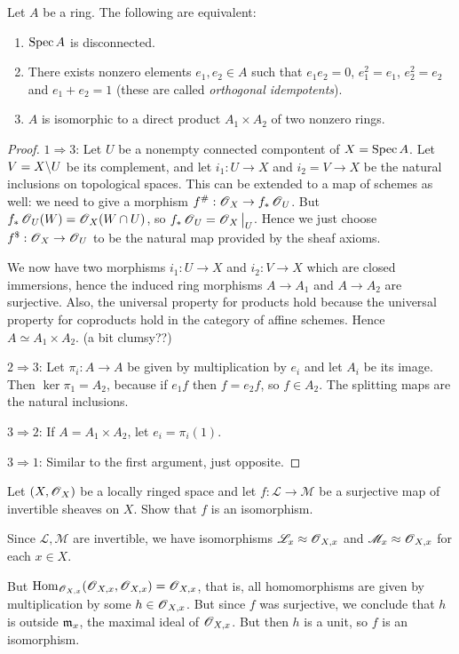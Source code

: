 \documentclass[11pt, english]{article}
\begin{document}
\begin{exc}[Exercise 2.19]
Let $A$ be a ring. The following are equivalent:
\begin{enumerate}
\item $\operatorname{Spec} A$ is disconnected.
\item There exists nonzero elements $e_1,e_2 \in A$ such that $e_1e_2=0$, $e_1^2=e_1$, $e_2^2=e_2$ and $e_1+e_2=1$ (these are called \emph{orthogonal idempotents}).
\item $A$ is isomorphic to a direct product $A_1 \times A_2$ of two nonzero rings.
\end{enumerate}
\end{exc}
\begin{proof}
$1 \Rightarrow 3$: Let $U$ be a nonempty connected compontent of $X=\operatorname{Spec} A$. Let $V = X \backslash U$ be its complement, and let $i_1:U \to X$ and $i_2=V \to X$ be the natural inclusions on topological spaces. This can be extended to a map of schemes as well: we need to give a morphism $f^\#:\operatorname{\mathscr{O}}_X \to f_\ast \operatorname{\mathscr{O}}_U$. But $f_\ast \operatorname{\mathscr{O}}_U(W)=\operatorname{\mathscr{O}}_X(W \cap U)$, so $f_\ast \OO_U = \restr{\OO_X}{U}$. Hence we just choose $f^\$:\operatorname{\mathscr{O}}_X \to \operatorname{\mathscr{O}}_U$ to be the natural map provided by the sheaf axioms.

We now have two morphisms $i_1:U \to X$ and $i_2:V \to X$ which are closed immersions, hence the induced ring morphisms $A \to A_1$ and $A \to A_2$ are surjective. Also, the universal property for products hold because the universal property for coproducts hold in the category of affine schemes. Hence $A \simeq A_1 \times A_2$.  (a bit clumsy??)

$2 \Rightarrow 3$: Let $\pi_i: A \to A$ be given by multiplication by $e_i$ and let $A_i$ be its image. Then $\ker \pi_1 = A_2$, because  if $e_1f$ then $f=e_2f$, so $f \in A_2$. The splitting maps are the natural inclusions. 

$3 \Rightarrow 2$: If $A = A_1 \times A_2$, let $e_i=\pi_i(1)$. 

$3 \Rightarrow 1$: Similar to the first argument, just opposite.
\end{proof}



\begin{exc}[Excercise 7.1]
Let $(X,\operatorname{\mathscr{O}}_X)$ be a locally ringed space and let $f:\mathscr L \to \mathscr M$ be a surjective map of invertible sheaves on $X$. Show that $f$ is an isomorphism.  
\end{exc}
\begin{sol}
Since $\mathscr L, \mathscr M$ are invertible, we have isomorphisms $\mathscr L_x \approx \operatorname{\mathscr{O}}_{X,x}$ and $\mathscr M_x \approx \operatorname{\mathscr{O}}_{X,x}$ for each $x \in X$.

But $\operatorname{Hom}_{\operatorname{\mathscr{O}}_{X,x}}(\operatorname{\mathscr{O}}_{X,x},\operatorname{\mathscr{O}}_{X,x})=\operatorname{\mathscr{O}}_{X,x}$, that is, all homomorphisms are given by multiplication by some $h \in \operatorname{\mathscr{O}}_{X,x}$. But since $f$ was surjective, we conclude that $h$ is outside $\mathfrak{m}_x$, the maximal ideal of $\operatorname{\mathscr{O}}_{X,x}$. But then $h$ is a unit, so $f$ is an isomorphism.
\end{sol}
\end{document}
